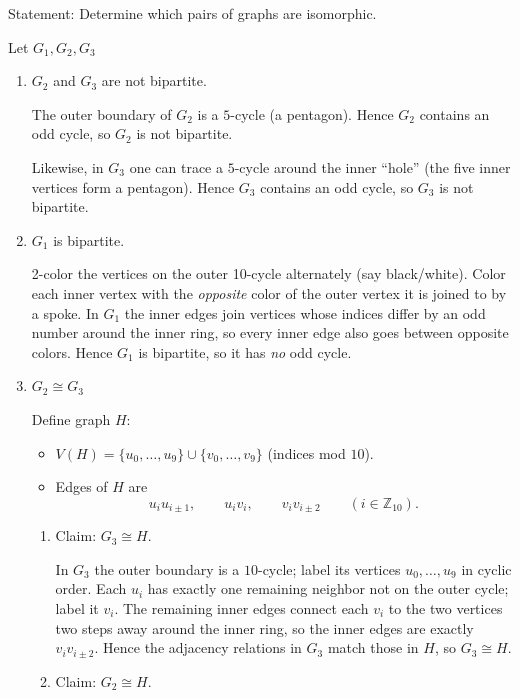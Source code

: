 \documentclass[11pt]{article}
\begin{document}
Statement: Determine which pairs of graphs are isomorphic.

\medskip

Let $G_1,G_2,G_3$

\medskip
\begin{enumerate}
    \item $G_2$ and $G_3$ are not bipartite.
    
The outer boundary of $G_2$ is a $5$-cycle (a pentagon). Hence $G_2$ contains an
odd cycle, so $G_2$ is not bipartite.

Likewise, in $G_3$ one can trace a $5$-cycle around the inner ``hole'' (the five inner
vertices form a pentagon). Hence $G_3$ contains an odd cycle, so $G_3$ is not bipartite.

\item $G_1$ is bipartite.

2-color the vertices on the outer 10-cycle alternately (say black/white).
Color each inner vertex with the \emph{opposite} color of the outer vertex it is joined to by a spoke.
In $G_1$ the inner edges join vertices whose indices differ by an odd number around the inner ring,
so every inner edge also goes between opposite colors. Hence $G_1$ is bipartite, so it has \emph{no}
odd cycle.

\medskip
\item $G_2\cong G_3$

Define graph $H$:
\begin{itemize}
\item $V(H)=\{u_0,\dots,u_9\}\cup\{v_0,\dots,v_9\}$ (indices mod $10$).
\item Edges of $H$ are
\[
u_i u_{i\pm 1},\qquad u_i v_i,\qquad v_i v_{i\pm 2}\qquad (i\in\mathbb{Z}_{10}).
\]
\end{itemize}

\begin{enumerate}
    \item Claim: $G_3\cong H$.
    
In $G_3$ the outer boundary is a $10$-cycle; label its vertices $u_0,\dots,u_9$ in cyclic order.
Each $u_i$ has exactly one remaining neighbor not on the outer cycle; label it $v_i$.
The remaining inner edges connect each $v_i$ to the two vertices two steps away around the inner ring,
so the inner edges are exactly $v_i v_{i\pm 2}$. Hence the adjacency relations in $G_3$ match those in $H$,
so $G_3\cong H$.
\item Claim: $G_2\cong H$.


\end{enumerate}
\end{enumerate}
\end{document}
